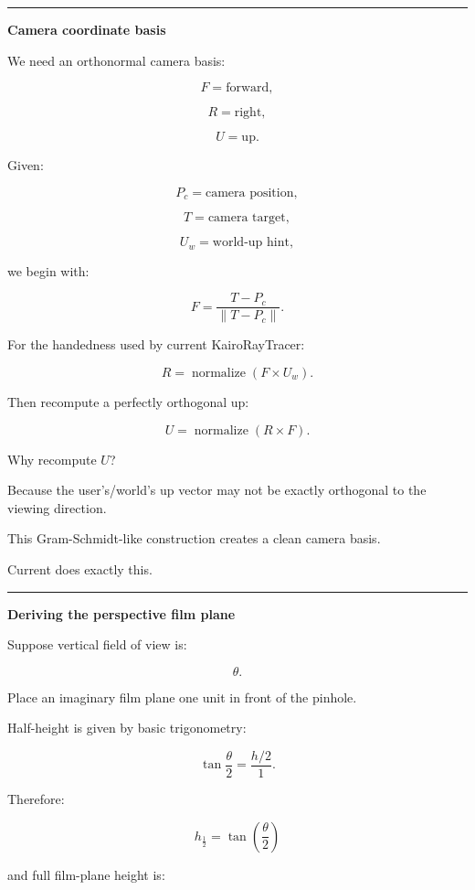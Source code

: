 \begin{center}\rule{0.5\linewidth}{0.5pt}\end{center}

\textbf{Camera coordinate basis}

We need an orthonormal camera basis:

\[
F=\text{forward},
\]

\[
R=\text{right},
\]

\[
U=\text{up}.
\]

Given:

\[
P_c=\text{camera position},
\]

\[
T=\text{camera target},
\]

\[
U_w=\text{world-up hint},
\]

we begin with:

\[
F=
\frac{T-P_c}
{\|T-P_c\|}.
\]

For the handedness used by current KairoRayTracer:

\[
R=
\operatorname{normalize}
(
F\times U_w
).
\]

Then recompute a perfectly orthogonal up:

\[
U=
\operatorname{normalize}
(
R\times F
).
\]

Why recompute \(U\)?

Because the user's/world's up vector may not be exactly orthogonal to the viewing direction.

This Gram-Schmidt-like construction creates a clean camera basis.

Current  does exactly this.

\begin{center}\rule{0.5\linewidth}{0.5pt}\end{center}

\textbf{Deriving the perspective film plane}

Suppose vertical field of view is:

\[
\theta.
\]

Place an imaginary film plane one unit in front of the pinhole.

Half-height is given by basic trigonometry:

\[
\tan\frac{\theta}{2}
=
\frac{h/2}{1}.
\]

Therefore:

\[
\boxed{
h_{\frac12}
=
\tan\left(\frac{\theta}{2}\right)
}
\]

and full film-plane height is:

